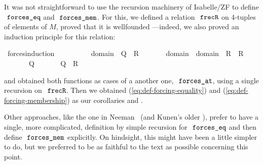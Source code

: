 It was not straightforward to use the recursion machinery of
Isabelle/ZF to define $\forceseq$ and $\forcesmem$. For this, we
defined a relation $\frecR$ on 4-tuples of elements of $M$, proved
that it is wellfounded ---indeed, we also proved an
induction principle for this relation:
%
\begin{isabelle}
\isamarkupfalse%
\ forces{\isacharunderscore}induction{\isacharcolon}\isanewline
\ \ \isanewline
\ \ \ \ {\isachardoublequoteopen}{\isasymAnd}{\isasymtau}\ {\isasymtheta}{\isachardot}\ {\isasymlbrakk}{\isasymAnd}{\isasymsigma}{\isachardot}\ {\isasymsigma}{\isasymin}domain{\isacharparenleft}{\isasymtheta}{\isacharparenright}\ {\isasymLongrightarrow}\ Q{\isacharparenleft}{\isasymtau}{\isacharcomma}{\isasymsigma}{\isacharparenright}{\isasymrbrakk}\ {\isasymLongrightarrow}\ R{\isacharparenleft}{\isasymtau}{\isacharcomma}{\isasymtheta}{\isacharparenright}{\isachardoublequoteclose}\isanewline
\ \ \ \ {\isachardoublequoteopen}{\isasymAnd}{\isasymtau}\ {\isasymtheta}{\isachardot}\ {\isasymlbrakk}{\isasymAnd}{\isasymsigma}{\isachardot}\ {\isasymsigma}{\isasymin}domain{\isacharparenleft}{\isasymtau}{\isacharparenright}\ {\isasymunion}\ domain{\isacharparenleft}{\isasymtheta}{\isacharparenright}\ {\isasymLongrightarrow}\ R{\isacharparenleft}{\isasymsigma}{\isacharcomma}{\isasymtau}{\isacharparenright}\ {\isasymand}\ R{\isacharparenleft}{\isasymsigma}{\isacharcomma}{\isasymtheta}{\isacharparenright}{\isasymrbrakk}\isanewline
\ \ \ \ \ \  {\isasymLongrightarrow}\ Q{\isacharparenleft}{\isasymtau}{\isacharcomma}{\isasymtheta}{\isacharparenright}{\isachardoublequoteclose}\isanewline
\ \ \isanewline
\ \ \ \ {\isachardoublequoteopen}Q{\isacharparenleft}{\isasymtau}{\isacharcomma}{\isasymtheta}{\isacharparenright}\ {\isasymand}\ R{\isacharparenleft}{\isasymtau}{\isacharcomma}{\isasymtheta}{\isacharparenright}{\isachardoublequoteclose}
\end{isabelle}
%
and 
obtained both functions as cases of a another one, 
$\forcesat$, using a single recursion on $\frecR$. Then we obtained 
(\ref{eq:def-forcing-equality}) and (\ref{eq:def-forcing-membership})
as our corollaries  and
.

Other approaches, like the one in Neeman~\cite{neeman-course} (and
Kunen's older \cite{kunen1980}), prefer
to have a single, more complicated, definition by simple recursion for
$\forceseq$ and then define $\forcesmem$ explicitly. On hindsight,
this might have been a little simpler to do, but we preferred to be as
faithful to the text as possible concerning this point.

